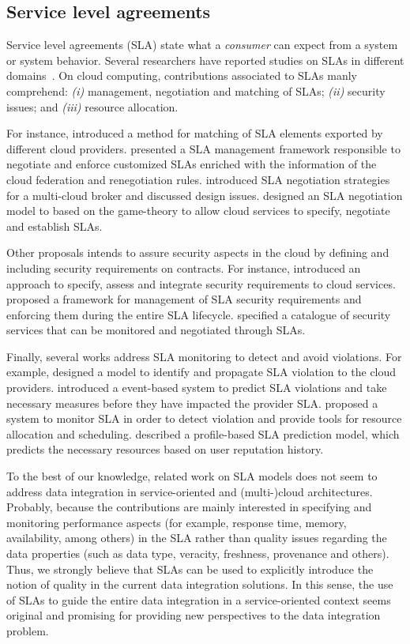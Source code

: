 \subsection{Service level agreements}
Service level agreements (SLA) state what a \textsl{consumer} can expect from a system or 
system behavior.
Several researchers have reported studies on SLAs in different domains~\cite{AlhamadDC11}.
On cloud computing, contributions associated to SLAs manly comprehend: \textit{(i)} management, 
negotiation and matching of SLAs; \textit{(ii)} security issues; and \textit{(iii)} resource allocation. 

For instance, \cite{Redl2012} introduced a method for matching of SLA elements exported by different cloud providers.
%
\cite{Mavrogeorgi2013} presented a SLA management framework responsible to negotiate and enforce
customized SLAs enriched with the information of the cloud federation and renegotiation rules.
%
\cite{Son2014} introduced SLA negotiation strategies for a multi-cloud broker and discussed
design issues.
%
\cite{Falasi2016} designed an SLA negotiation model to based on the game-theory to allow cloud
services to specify, negotiate and establish SLAs.
%  

Other proposals intends to assure security aspects in the cloud by defining and including
security requirements on contracts. For instance, \cite{rak2013} introduced an approach to specify,
assess and integrate security requirements to cloud services. 
%
\cite{Rojas2016} proposed a framework for management of SLA security requirements and enforcing them
during the entire SLA lifecycle.
%
\cite{Casola2016} specified a catalogue of security services that can be monitored and negotiated through SLAs.

Finally, several works address SLA monitoring to detect and avoid violations.
For example, \cite{Brandic2010} designed a model to identify and propagate
SLA violation to the cloud providers. 
\cite{Leitner2010} introduced a event-based system to predict SLA violations
and take necessary measures before they have impacted the provider SLA.
\cite{Emeakaroha2012} proposed a system to monitor SLA in order to detect violation
and provide tools for resource allocation and scheduling. 
\cite{Hussain2015} described a profile-based SLA prediction model, which predicts
the necessary resources based on user reputation history.
 
To the best of our knowledge, related work on SLA models does not seem to 
address data integration in service-oriented and (multi-)cloud architectures. Probably, because the 
contributions are mainly interested in specifying and monitoring performance 
aspects (for example, response time, memory, availability, among others) in the SLA 
rather than quality issues regarding the data properties (such as data type, 
veracity, freshness, provenance and others).
Thus, we strongly believe that SLAs can be used to explicitly introduce the 
notion of quality in the current data integration solutions. 
In this sense, the use of SLAs to guide the entire data integration in a 
service-oriented context seems original and promising for providing new perspectives to the data integration problem.

